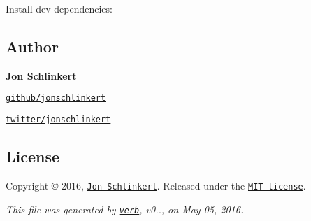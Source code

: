 Install dev dependencies\+:




\subsection*{Author}

{\bfseries Jon Schlinkert}


\begin{DoxyItemize}
\item \href{https://github.com/jonschlinkert}{\tt github/jonschlinkert}
\item \href{http://twitter.com/jonschlinkert}{\tt twitter/jonschlinkert}
\end{DoxyItemize}

\subsection*{License}

Copyright © 2016, \href{https://github.com/jonschlinkert}{\tt Jon Schlinkert}. Released under the \href{https://github.com/jonschlinkert/expand-range/blob/master/LICENSE}{\tt M\+IT license}.





{\itshape This file was generated by \href{https://github.com/verbose/verb}{\tt verb}, v0.., on May 05, 2016.} 